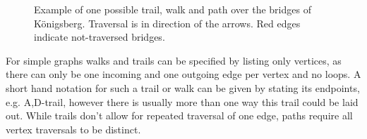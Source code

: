 \begin{figure}[htb]
{
    }
    \caption{Example of one possible \protect{} trail,
    \protect{} walk and \protect{} path
    over the bridges of K\"onigsberg. Traversal is in direction of the arrows.
    Red edges indicate not-traversed bridges.}
    \label{fig:walkkoenigsberg}
\end{figure}
%
For simple graphs walks and trails can be specified by listing only vertices,
as there can only be one incoming and one outgoing edge per vertex and no
loops. A short hand notation for such a trail or walk can be given by stating
its endpoints, e.g. A,D-trail, however there is usually more than one way this
trail could be laid out. While trails don't allow for repeated traversal of one
edge, paths require all vertex traversals to be distinct. 


